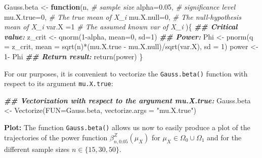 \documentclass[
]{book}
\newenvironment{Shaded}{\begin{snugshade}}{\end{snugshade}}
\newcommand{\AttributeTok}[1]{\textcolor[rgb]{0.77,0.63,0.00}{#1}}
\newcommand{\CommentTok}[1]{\textcolor[rgb]{0.56,0.35,0.01}{\textit{#1}}}
\newcommand{\ControlFlowTok}[1]{\textcolor[rgb]{0.13,0.29,0.53}{\textbf{#1}}}
\newcommand{\DecValTok}[1]{\textcolor[rgb]{0.00,0.00,0.81}{#1}}
\newcommand{\DocumentationTok}[1]{\textcolor[rgb]{0.56,0.35,0.01}{\textbf{\textit{#1}}}}
\newcommand{\FloatTok}[1]{\textcolor[rgb]{0.00,0.00,0.81}{#1}}
\newcommand{\FunctionTok}[1]{\textcolor[rgb]{0.00,0.00,0.00}{#1}}
\newcommand{\NormalTok}[1]{#1}
\newcommand{\OtherTok}[1]{\textcolor[rgb]{0.56,0.35,0.01}{#1}}
\newcommand{\SpecialCharTok}[1]{\textcolor[rgb]{0.00,0.00,0.00}{#1}}
\newcommand{\StringTok}[1]{\textcolor[rgb]{0.31,0.60,0.02}{#1}}
\begin{document}
\begin{Shaded}
\begin{Highlighting}[]
\NormalTok{Gauss.beta }\OtherTok{\textless{}{-}} \ControlFlowTok{function}\NormalTok{(n,             }\CommentTok{\# sample size  }
                       \AttributeTok{alpha=}\FloatTok{0.05}\NormalTok{,    }\CommentTok{\# significance level}
                       \AttributeTok{mu.X.true=}\DecValTok{0}\NormalTok{,   }\CommentTok{\# The true mean of X\_i }
                       \AttributeTok{mu.X.null=}\DecValTok{0}\NormalTok{,   }\CommentTok{\# The null{-}hypothesis mean of X\_i}
                       \AttributeTok{var.X    =}\DecValTok{1}    \CommentTok{\# The assumed known var of X\_i}
\NormalTok{                       )\{}
  \DocumentationTok{\#\# Critical value:}
\NormalTok{  z\_crit }\OtherTok{\textless{}{-}} \FunctionTok{qnorm}\NormalTok{(}\DecValTok{1}\SpecialCharTok{{-}}\NormalTok{alpha, }\AttributeTok{mean=}\DecValTok{0}\NormalTok{, }\AttributeTok{sd=}\DecValTok{1}\NormalTok{)}
  \DocumentationTok{\#\# Power:}
\NormalTok{  Phi }\OtherTok{\textless{}{-}} \FunctionTok{pnorm}\NormalTok{(}\AttributeTok{q    =}\NormalTok{ z\_crit, }
               \AttributeTok{mean =} \FunctionTok{sqrt}\NormalTok{(n)}\SpecialCharTok{*}\NormalTok{(mu.X.true }\SpecialCharTok{{-}}\NormalTok{ mu.X.null)}\SpecialCharTok{/}\FunctionTok{sqrt}\NormalTok{(var.X), }
               \AttributeTok{sd   =} \DecValTok{1}\NormalTok{)}
\NormalTok{  power }\OtherTok{\textless{}{-}} \DecValTok{1}\SpecialCharTok{{-}}\NormalTok{ Phi}
  \DocumentationTok{\#\# Return result:}
  \FunctionTok{return}\NormalTok{(power)}
\NormalTok{\}}
\end{Highlighting}
\end{Shaded}

For our purposes, it is convenient to vectorize the \texttt{Gauss.beta()} function with respect to its argument \texttt{mu.X.true}:

\begin{Shaded}
\begin{Highlighting}[]
\DocumentationTok{\#\# Vectorization with respect to the argument \textasciigrave{}mu.X.true\textasciigrave{}:}
\NormalTok{Gauss.beta }\OtherTok{\textless{}{-}} \FunctionTok{Vectorize}\NormalTok{(}\AttributeTok{FUN=}\NormalTok{Gauss.beta, }\AttributeTok{vectorize.args =} \StringTok{"mu.X.true"}\NormalTok{)}
\end{Highlighting}
\end{Shaded}

\textbf{Plot:}
The function \texttt{Gauss.beta()} allows us now to easily produce a plot of the trajectories of the power function
\(\beta^{Z}_{n,0.05}(\mu_X)\) for \(\mu_X\in\Omega_0\cup\Omega_1\) and for the different sample sizes \(n\in\{15,30,50\}\).
\end{document}

